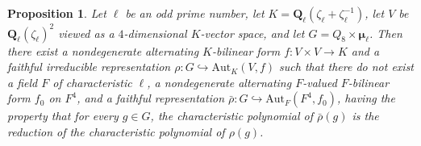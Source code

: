 \documentclass{amsart}
\def\Q{{\mathbf Q}}
\def\f{{\tilde F}}
\def\Aut{\mathrm{Aut}}
\def\FF{F}
\def\f{f}
\def\bmu{\boldsymbol \mu}
\newtheorem{prop}[thm]{Proposition}
\theoremstyle{definition}
\begin{document}
\begin{prop}
\label{fincounterex}
Let $\ell$ be an odd prime number, let
$K = \Q_\ell(\zeta_\ell+\zeta_\ell^{-1})$, 
let $V$ be $\Q_\ell(\zeta_\ell)^2$ viewed as a $4$-dimensional
$K$-vector space, and   
let $G = Q_8 \times \bmu_\ell$.
Then there exist a nondegenerate alternating 
$K$-bilinear form $\f:V \times V \to K$ 
and a faithful irreducible representation
$\rho : G \hookrightarrow \Aut_K(V,{\f})$ such that
there do not exist a field $\FF$ of characteristic $\ell$,
a nondegenerate alternating 
$\FF$-valued $\FF$-bilinear form ${{\f}_0}$ on $\FF^4$,
and a faithful representation
${\bar \rho} : G \hookrightarrow \Aut_\FF(\FF^4,\f_0)$,
having the property that for every $g \in G$, the characteristic
polynomial of ${\bar \rho}(g)$ is the reduction of 
the characteristic polynomial of $\rho(g)$.
\end{prop}
\end{document}
